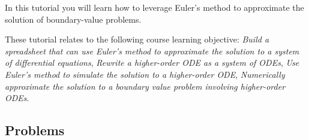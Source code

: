 		\begin{objectives}
			In this tutorial you will learn how to leverage Euler's method to approximate the solution of boundary-value problems.
				
			These tutorial relates to the following course learning objective:
			\textit{Build a spreadsheet that can use Euler's method to approximate the solution to a system of differential equations}, \textit{Rewrite a higher-order ODE as a system of ODEs}, \textit{Use Euler's method to simulate the solution to a higher-order ODE}, \textit{Numerically approximate the solution to a boundary value problem involving higher-order ODEs}.
		\end{objectives}


		\vspace{-.5em}
		\subsection*{Problems}
		\vspace{-.5em}






